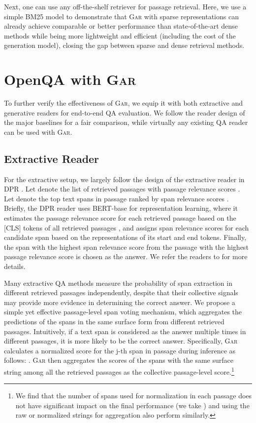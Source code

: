 \documentclass[11pt,a4paper]{article}
\newcommand{\ours}{\textsc{Gar}\xspace}
\begin{document}
Next, one can use any off-the-shelf retriever for passage retrieval.
Here, we use a simple BM25 model to demonstrate that \ours with sparse representations can already achieve comparable or better performance than state-of-the-art dense methods while being more lightweight and efficient (including the cost of the generation model), closing the gap between sparse and dense retrieval methods.


\section{OpenQA with \ours}
To further verify the effectiveness of \ours, we equip it with both extractive and generative readers for end-to-end QA evaluation. We follow the reader design of the major baselines for a fair comparison, while virtually any existing QA reader can be used with \ours.

\subsection{Extractive Reader}
For the extractive setup, we largely follow the design of the extractive reader in DPR \cite{karpukhin2020dense}.
Let  denote the list of retrieved passages with passage relevance scores . Let  denote the top  text spans in passage  ranked by span relevance scores .
Briefly, the DPR reader uses BERT-base \cite{devlin-etal-2019-bert} for representation learning, where it estimates the passage relevance score  for each retrieved passage  based on the [CLS] tokens of all retrieved passages , and assigns span relevance scores  for each candidate span based on the representations of its start and end tokens.
Finally, the span with the highest span relevance score from the passage with the highest passage relevance score is chosen as the answer.
We refer the readers to \citet{karpukhin2020dense} for more details.


Many extractive QA methods \cite{chen-etal-2017-reading,min2019knowledge,guu2020realm,karpukhin2020dense} measure the probability of span extraction in different retrieved passages independently, despite that their collective signals may provide more evidence in determining the correct answer.
We propose a simple yet effective passage-level span voting mechanism, which aggregates the predictions of the spans in the same surface form from different retrieved passages.
Intuitively, if a text span is considered as the answer multiple times in different passages, it is more likely to be the correct answer.
Specifically,  \ours calculates a normalized score  for the j-th span in passage  during inference as follows: .
\ours then aggregates the scores of the spans with the same surface string among all the retrieved passages as the collective passage-level score.\footnote{We find that the number of spans used for normalization in each passage does not have significant impact on the final performance (we take ) and using the raw or normalized strings for aggregation also perform similarly.}
\end{document}
